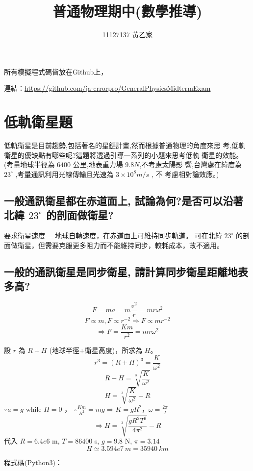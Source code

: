 \documentclass[UTF8,a4paper,12pt]{article}
\title{\fontsize{18pt}{\baselineskip} \textbf{普通物理期中(數學推導)}}
\author{\fontsize{16pt}{\baselineskip}11127137 黃乙家}
\date{}
\begin{document}
\maketitle

\fontsize{12pt}{\baselineskip}

所有模擬程式碼皆放在Github上，

連結：\url{https://github.com/ja-errorpro/GeneralPhysicsMidtermExam}

\section{低軌衛星題}

低軌衛星是目前趨勢,包括著名的星鏈計畫,然而根據普通物理的角度來思
考,低軌衛星的優缺點有哪些呢?這題將透過引導一系列的小題來思考低軌
衛星的效能。(考量地球半徑為 $6400$ 公里,地表重力場 $9.8 N$,不考慮太陽影
響,台灣處在緯度為 $ 23^\circ $ ,考量通訊利用光線傳輸且光速為 $ 3 \times 10^8 m/s $ , 不
考慮相對論效應。)

\subsection{一般通訊衛星都在赤道面上, 試論為何?是否可以沿著北緯 \texorpdfstring{$ 23^\circ $}{23} 的剖面做衛星?}

要求衛星速度 = 地球自轉速度，在赤道面上可維持同步軌道。
可在北緯 $ 23^\circ $ 的剖面做衛星，但需要克服更多阻力而不能維持同步，較耗成本，故不適用。

\subsection{一般的通訊衛星是同步衛星, 請計算同步衛星距離地表多高?}

$$ F = ma = m \frac{v^2}{r} = mr\omega^2 $$
$$ F \propto m ,  F \propto r^{-2} \Rightarrow F \propto mr^{-2} $$
$$ \Rightarrow F = \frac{Km}{r^2} = mr\omega^2 $$

\newpage

設 $r$ 為 $R + H$ (地球半徑+衛星高度)，所求為 $H$。
$$ r^3 = (R+H)^3 = \frac{K}{\omega^2}  $$
$$ R + H = \sqrt[3]{\frac{K}{\omega^2}} $$
$$ H = \sqrt[3]{\frac{K}{\omega^2}} - R $$
$ \because a = g $ while $H = 0$ ， $\therefore \frac{Km}{R^2} = mg \Rightarrow K = gR^2 $，$\omega = \frac{2\pi}{T}$
$$ \Rightarrow H = \sqrt[3]{\frac{gR^2T^2}{4\pi^2}} - R $$
代入 $R = 6.4e6 $ m, $T = 86400$ s, $g = 9.8$ N, $\pi = 3.14$
$$ H \simeq 3.594e7\ m = 35940\ km$$

程式碼(Python3)：
\end{document}
